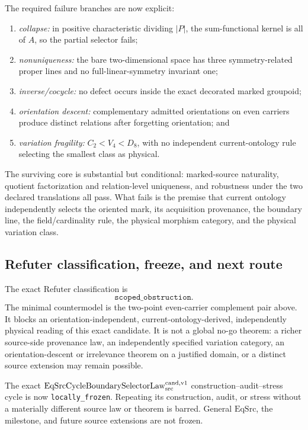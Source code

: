 The required failure branches are now explicit:
\begin{enumerate}
  \item \emph{collapse:} in positive characteristic dividing \(|P|\), the
  sum-functional kernel is all of \(A\), so the partial selector fails;
  \item \emph{nonuniqueness:} the bare two-dimensional space has three
  symmetry-related proper lines and no full-linear-symmetry invariant one;
  \item \emph{inverse/cocycle:} no defect occurs inside the exact decorated
  marked groupoid;
  \item \emph{orientation descent:} complementary admitted orientations on
  even carriers produce distinct relations after forgetting orientation;
  and
  \item \emph{variation fragility:} \(C_2<V_4<D_8\), with no independent
  current-ontology rule selecting the smallest class as physical.
\end{enumerate}

The surviving core is substantial but conditional: marked-source naturality,
quotient factorization and relation-level uniqueness, and robustness under
the two declared translations all pass.  What fails is the premise that
current ontology independently selects the oriented mark, its acquisition
provenance, the boundary line, the field/cardinality rule, the physical
morphism category, and the physical variation class.

\subsection{Refuter classification, freeze, and next route}

The exact Refuter classification is
\[
 \texttt{scoped\_obstruction}.
\]
The minimal countermodel is the two-point even-carrier complement pair above.
It blocks an orientation-independent, current-ontology-derived, independently
physical reading of this exact candidate.  It is not a global no-go theorem:
a richer source-side provenance law, an independently specified variation
category, an orientation-descent or irrelevance theorem on a justified
domain, or a distinct source extension may remain possible.

The exact
\(\mathrm{EqSrcCycleBoundarySelectorLaw}_{\rm src}^{\rm cand,v1}\)
construction--audit--stress cycle is now
\texttt{locally\_frozen}.  Repeating its construction, audit, or stress
without a materially different source law or theorem is barred.  General
\(\mathrm{EqSrc}\), the milestone, and future source extensions are not
frozen.


